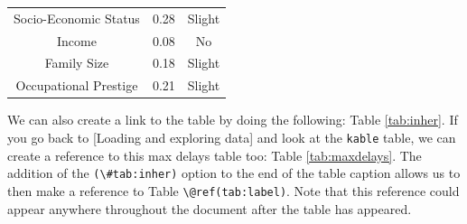 \documentclass[12pt,twoside]{reedthesis}
\theoremstyle{definition}
\theoremstyle{definition}
\theoremstyle{definition}
\theoremstyle{remark}
\begin{document}
\begin{longtable}[]{@{}ccc@{}}
\begin{minipage}[t]{0.29\columnwidth}
Socio-Economic Status\strut
\end{minipage} & \begin{minipage}[t]{0.47\columnwidth}\centering\strut
0.28\strut
\end{minipage} & \begin{minipage}[t]{0.16\columnwidth}\centering\strut
Slight\strut
\end{minipage}\tabularnewline
\begin{minipage}[t]{0.29\columnwidth}\centering\strut
Income\strut
\end{minipage} & \begin{minipage}[t]{0.47\columnwidth}\centering\strut
0.08\strut
\end{minipage} & \begin{minipage}[t]{0.16\columnwidth}\centering\strut
No\strut
\end{minipage}\tabularnewline
\begin{minipage}[t]{0.29\columnwidth}\centering\strut
Family Size\strut
\end{minipage} & \begin{minipage}[t]{0.47\columnwidth}\centering\strut
0.18\strut
\end{minipage} & \begin{minipage}[t]{0.16\columnwidth}\centering\strut
Slight\strut
\end{minipage}\tabularnewline
\begin{minipage}[t]{0.29\columnwidth}\centering\strut
Occupational Prestige\strut
\end{minipage} & \begin{minipage}[t]{0.47\columnwidth}\centering\strut
0.21\strut
\end{minipage} & \begin{minipage}[t]{0.16\columnwidth}\centering\strut
Slight\strut
\end{minipage}\tabularnewline
\bottomrule
\end{longtable}
We can also create a link to the table by doing the following: Table
\ref{tab:inher}. If you go back to {[}Loading and exploring data{]} and
look at the \texttt{kable} table, we can create a reference to this max
delays table too: Table \ref{tab:maxdelays}. The addition of the
\texttt{(\textbackslash{}\#tab:inher)} option to the end of the table
caption allows us to then make a reference to Table
\texttt{\textbackslash{}@ref(tab:label)}. Note that this reference could
appear anywhere throughout the document after the table has appeared.
\end{document}

